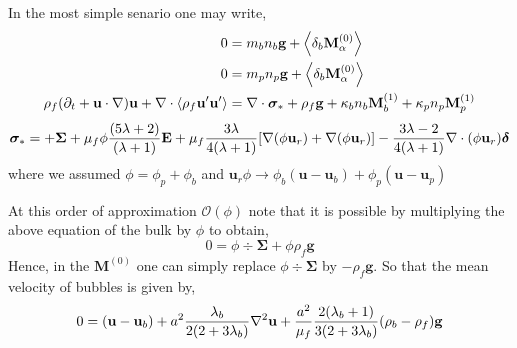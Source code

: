 In the most simple senario one may write,
\begin{align}
    0
    &= 
    m_b n_b \textbf{g}
    + \pavg[b]{\textbf{M}^{(0)}_\alpha}
    \\
    0
    &= 
    m_p n_p \textbf{g}
    + \pavg[b]{\textbf{M}^{(0)}_\alpha}
    \\
    \rho_f (\pddt + \textbf{u} \cdot \grad)\textbf{u}
    + \div \avg{\rho_f \textbf{u}' \textbf{u}'}
    &= 
    \div \bm\sigma_*
    + \rho_f \textbf{g}
    +\kappa_b   n_b \textbf{M}_b^{(1)}
    +\kappa_p   n_p \textbf{M}_p^{(1)}
\end{align}
\begin{align*}
    \bm\sigma_*  = 
    + \bm\Sigma
    + \mu_f \phi  \frac{(5\lambda +2)}{(\lambda +1)}\textbf{E} 
    + \mu_f \frac{3\lambda}{4(\lambda +1)}[\grad (\phi \textbf{u}_r)+\grad (\phi\textbf{u}_r)] 
    - \frac{3\lambda-2}{4(\lambda+1)}\div (\phi\textbf{u}_r) \bm\delta 
\end{align*}
where we assumed $\phi = \phi_p + \phi_b$ and $\textbf{u}_r\phi \to \phi_b(\textbf{u}-\textbf{u}_b ) + \phi_p (\textbf{u}- \textbf{u}_p)$

At this order of approximation $\mathcal{O}(\phi)$ note that it is possible by multiplying the above equation of the bulk  by $\phi$ to obtain, 
\begin{equation}
    0
    = 
    \phi \div \bm\Sigma
    + \phi \rho_f \textbf{g}
\end{equation}
Hence, in the $\textbf{M}^{(0)}$ one can simply replace $\phi \div \bm\Sigma$ by $-\rho_f \textbf{g}$. 
So that the mean velocity of bubbles is given by, 
\begin{equation}
    0
    =
    (\textbf{u} - \textbf{u}_b)
    +  a^2 \frac{\lambda_b}{2(2+3\lambda_b)} \grad^2 \textbf{u}
    + \frac{a^2}{\mu_f}\frac{2(\lambda_b +1 )}{3(2+3\lambda_b)} (\rho_b - \rho_f )\textbf{g}
\end{equation}



